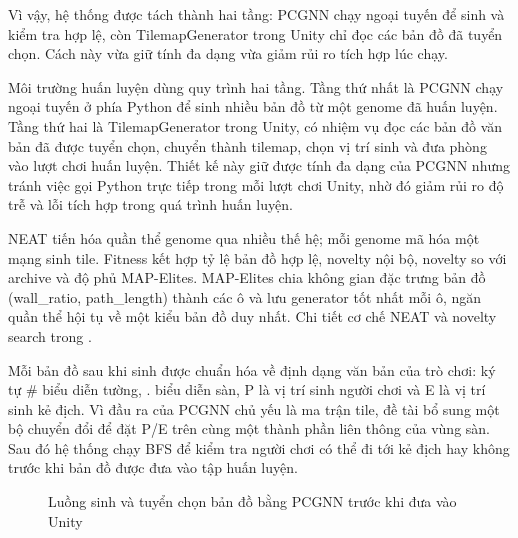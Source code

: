 Vì vậy, hệ thống được tách thành hai tầng: PCGNN chạy ngoại tuyến để sinh và kiểm tra hợp lệ, còn TilemapGenerator trong Unity chỉ đọc các bản đồ đã tuyển chọn. Cách này vừa giữ tính đa dạng vừa giảm rủi ro tích hợp lúc chạy.

Môi trường huấn luyện dùng quy trình hai tầng. Tầng thứ nhất là PCGNN chạy ngoại tuyến ở phía Python để sinh nhiều bản đồ từ một genome đã huấn luyện. Tầng thứ hai là TilemapGenerator trong Unity, có nhiệm vụ đọc các bản đồ văn bản đã được tuyển chọn, chuyển thành tilemap, chọn vị trí sinh và đưa phòng vào lượt chơi huấn luyện. Thiết kế này giữ được tính đa dạng của PCGNN nhưng tránh việc gọi Python trực tiếp trong mỗi lượt chơi Unity, nhờ đó giảm rủi ro độ trễ và lỗi tích hợp trong quá trình huấn luyện.

NEAT tiến hóa quần thể genome qua nhiều thế hệ; mỗi genome mã hóa một mạng sinh tile. Fitness kết hợp tỷ lệ bản đồ hợp lệ, novelty nội bộ, novelty so với archive và độ phủ MAP-Elites. MAP-Elites chia không gian đặc trưng bản đồ (wall\_ratio, path\_length) thành các ô và lưu generator tốt nhất mỗi ô, ngăn quần thể hội tụ về một kiểu bản đồ duy nhất. Chi tiết cơ chế NEAT và novelty search trong \cite{Beukman2022}.


Mỗi bản đồ sau khi sinh được chuẩn hóa về định dạng văn bản của trò chơi: ký tự \# biểu diễn tường, . biểu diễn sàn, P là vị trí sinh người chơi và E là vị trí sinh kẻ địch. Vì đầu ra của PCGNN chủ yếu là ma trận tile, đề tài bổ sung một bộ chuyển đổi để đặt P/E trên cùng một thành phần liên thông của vùng sàn. Sau đó hệ thống chạy BFS để kiểm tra người chơi có thể đi tới kẻ địch hay không trước khi bản đồ được đưa vào tập huấn luyện.

\begin{figure}[H]
    \centering
    \caption{Luồng sinh và tuyển chọn bản đồ bằng PCGNN trước khi đưa vào Unity}
    \label{fig:map_generation_workflow}
\end{figure}

